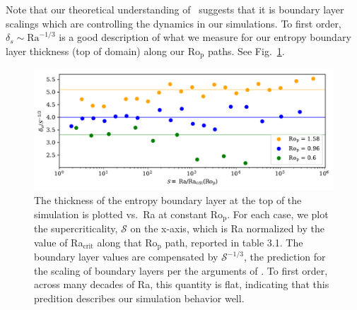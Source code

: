 Note that our theoretical understanding of \pro$\,$ suggests that it is boundary layer scalings which are controlling the dynamics in our simulations.
To first order, $\delta_s \sim \text{Ra}^{-1/3}$ is a good description of what we measure for our entropy boundary layer thickness (top of domain) along our Ro$_\text{p}$ paths.
See Fig.~\ref{fig:ro_p_boundary_layers}.
\begin{figure}[t!]
\includegraphics[width=\textwidth]{./figs/revisions/ro_p_boundary_layers.pdf}
\caption[Thermal Boundary layer thickness in rotating, polytropic atmospheres.]{ 
	The thickness of the entropy boundary layer at the top of the simulation is plotted vs.~Ra at constant Ro$_{\text{p}}$.
	For each case, we plot the supercriticality, $\mathcal{S}$ on the x-axis, which is Ra normalized by the value of Ra$_{\text{crit}}$ along that Ro$_{\text{p}}$ path, reported in table 3.1.
	The boundary layer values are compensated by $\mathcal{S}^{-1/3}$, the prediction for the scaling of boundary layers per the arguments of \citet{king&all2012}.
	To first order, across many decades of Ra, this quantity is flat, indicating that this predition describes our simulation behavior well.
	\label{fig:ro_p_boundary_layers} }
\end{figure}








